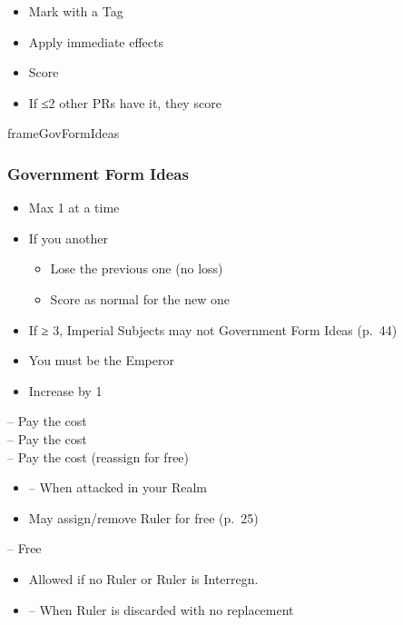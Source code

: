 \documentclass[10pt]{article}
\newlength{\fhGovFormIdeas} \setlength\fhGovFormIdeas{7\baselineskip}
\begin{document}
\begin{itemize}
	\item Mark with a Tag
	\item Apply immediate effects
	\item Score 
	\item If ≤2 other PRs have it, they score 
\end{itemize}
\begin{dynamiccontents*}{frameGovFormIdeas}\begin{eubox}{\fhGovFormIdeas}
	\subsubsection*{Government Form Ideas }
	\begin{itemize}
		\item Max 1 at a time
		\item If you  another
		\begin{itemize}
			\item Lose the previous one (no \prestige loss)
			\item Score \prestige as normal for the new one
		\end{itemize}
		\item If \authority ≥ 3, Imperial Subjects may not  Government Form Ideas (p.~44)
	\end{itemize}
\end{eubox}\end{dynamiccontents*}

\framebreak
{}
\begin{itemize}
	\item You must be the Emperor
	\item Increase \authority by 1
\end{itemize}

 -- Pay the \ducat cost\\
 -- Pay the \milpower cost\\
 -- Pay the \milpower cost (reassign for free)\\
\begin{itemize}
	\item \reaction -- When attacked in your Realm
	\item May assign/remove Ruler for free (p.~25)
\end{itemize}
 -- Free
\begin{itemize}
	\item Allowed if no Ruler or Ruler is \dprime Interregn.\dprime
	\item \reaction -- When Ruler is discarded with no replacement
\end{itemize}
\end{document}
